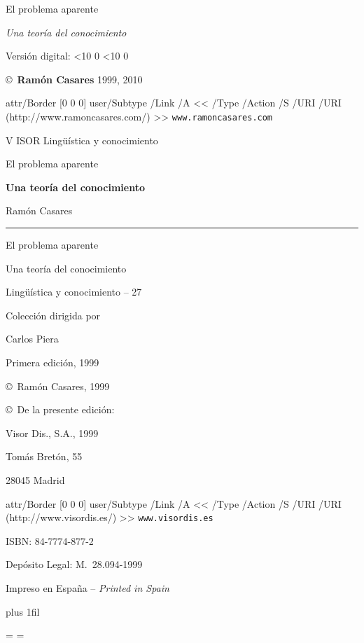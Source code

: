 \def\epaversion{\the\year%
 \ifnum\month<10 0\fi \the\month%
 \ifnum\day<10 0\fi\the\day}

 {\lmtwo El problema aparente}\par
 {\sl Una teoría del conocimiento}\par
 Versión digital: \epaversion \par
 \copyright\ {\bf Ramón Casares} 1999, 2010\par
 \leavevmode \pdfcode \pdfstartlink attr{/Border [0 0 0]}
   user{/Subtype /Link /A << /Type /Action
    /S /URI /URI (http://www.ramoncasares.com/) >>}\pdfendcode
  {\tt www.ramoncasares.com}\pdfcode \pdfendlink \pdfendcode \par

\break %

\centerline{\lmxiibf V{\lmviiibf\kern-1pt ISOR}
        Lingüística y conocimiento}\newpage %


\null\newpage %

\centerline{\lmxiibf El problema aparente}
\centerline{\bf Una teoría del conocimiento}
\newpage %
\null\newpage %

\centerline{\lmone Ramón Casares}
\vskip 9pt
\hrule height 1pt
\vskip 12pt
\centerline{\lmxiizero El problema aparente}
\vskip 1pc
\centerline{\lmxiione Una teoría del conocimiento}
\vfill \break %

\centerline{\lmxiibf Lingüística y conocimiento -- 27}
\centerline{Colección dirigida por}
\centerline{Carlos Piera}
\vskip4pc
\centerline{Primera edición, 1999}
\vfil
\centerline{\copyright\ Ramón Casares, 1999}
\centerline{\copyright\ De la presente edición:}
\centerline{\sc Visor Dis., S.A., 1999}
\centerline{Tomás Bretón, 55}
\centerline{28045 Madrid}
\centerline{\pdfcode \pdfstartlink attr{/Border [0 0 0]}
   user{/Subtype /Link /A << /Type /Action
    /S /URI /URI (http://www.visordis.es/) >>}\pdfendcode
  {\tt www.visordis.es}\pdfcode \pdfendlink \pdfendcode}
\smallskip
\centerline{ISBN: 84-7774-877-2}
\centerline{Depósito Legal: M.\ 28.094-1999}
\smallskip
\centerline{Impreso en España -- \it Printed in Spain}
\break %

\vglue 0pt plus 1fil


\vskip5pc

\vfil
\vfil

\break %

\footline={\tenrm\ifodd\pageno \hfil\folio \else \folio\hfil \fi}
\footline={\tenrm\ifodd\pageno \docinfo\hfil\folio
            \else \folio\hfil\infodoc \fi\strut}
\endinput

